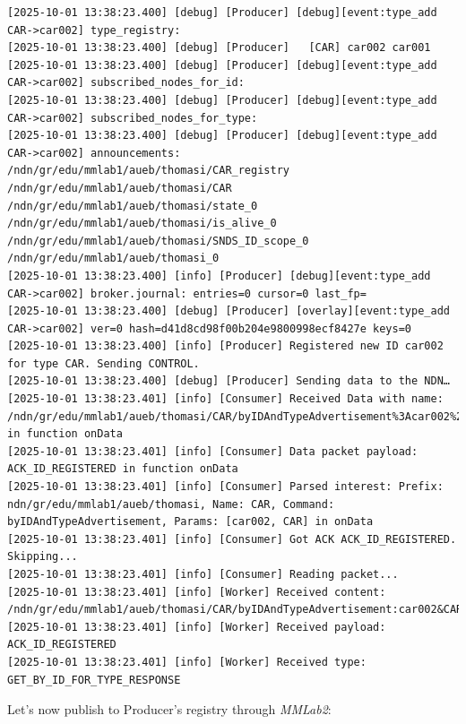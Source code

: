 \documentclass{article}
\begin{document}
\begin{lstlisting}[language=log, caption={Producer SeEDS Service logs after publishing \textit{@ids=car001,car002} to the \textit{@type=CAR} registry}, label={lst:publish-to-registry}]
[2025-10-01 13:38:23.400] [debug] [Producer] [debug][event:type_add CAR->car002] type_registry:
[2025-10-01 13:38:23.400] [debug] [Producer]   [CAR] car002 car001 
[2025-10-01 13:38:23.400] [debug] [Producer] [debug][event:type_add CAR->car002] subscribed_nodes_for_id:
[2025-10-01 13:38:23.400] [debug] [Producer] [debug][event:type_add CAR->car002] subscribed_nodes_for_type:
[2025-10-01 13:38:23.400] [debug] [Producer] [debug][event:type_add CAR->car002] announcements: /ndn/gr/edu/mmlab1/aueb/thomasi/CAR_registry /ndn/gr/edu/mmlab1/aueb/thomasi/CAR /ndn/gr/edu/mmlab1/aueb/thomasi/state_0 /ndn/gr/edu/mmlab1/aueb/thomasi/is_alive_0 /ndn/gr/edu/mmlab1/aueb/thomasi/SNDS_ID_scope_0 /ndn/gr/edu/mmlab1/aueb/thomasi_0 
[2025-10-01 13:38:23.400] [info] [Producer] [debug][event:type_add CAR->car002] broker.journal: entries=0 cursor=0 last_fp=
[2025-10-01 13:38:23.400] [debug] [Producer] [overlay][event:type_add CAR->car002] ver=0 hash=d41d8cd98f00b204e9800998ecf8427e keys=0
[2025-10-01 13:38:23.400] [info] [Producer] Registered new ID car002 for type CAR. Sending CONTROL.
[2025-10-01 13:38:23.400] [debug] [Producer] Sending data to the NDN…
[2025-10-01 13:38:23.401] [info] [Consumer] Received Data with name: /ndn/gr/edu/mmlab1/aueb/thomasi/CAR/byIDAndTypeAdvertisement%3Acar002%26CAR in function onData
[2025-10-01 13:38:23.401] [info] [Consumer] Data packet payload: ACK_ID_REGISTERED in function onData
[2025-10-01 13:38:23.401] [info] [Consumer] Parsed interest: Prefix: ndn/gr/edu/mmlab1/aueb/thomasi, Name: CAR, Command: byIDAndTypeAdvertisement, Params: [car002, CAR] in onData
[2025-10-01 13:38:23.401] [info] [Consumer] Got ACK ACK_ID_REGISTERED. Skipping...
[2025-10-01 13:38:23.401] [info] [Consumer] Reading packet...
[2025-10-01 13:38:23.401] [info] [Worker] Received content: /ndn/gr/edu/mmlab1/aueb/thomasi/CAR/byIDAndTypeAdvertisement:car002&CAR
[2025-10-01 13:38:23.401] [info] [Worker] Received payload: ACK_ID_REGISTERED
[2025-10-01 13:38:23.401] [info] [Worker] Received type: GET_BY_ID_FOR_TYPE_RESPONSE
\end{lstlisting}

Let's now publish to Producer's  registry through \emph{MMLab2}:
\end{document}
